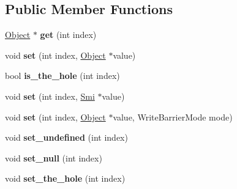 \subsection*{Public Member Functions}
\begin{DoxyCompactItemize}
\item 
\hypertarget{classv8_1_1internal_1_1_fixed_array_a44361ce215ec75f98ba22f84f7d4b360}{}\hyperlink{classv8_1_1internal_1_1_object}{Object} $\ast$ {\bfseries get} (int index)\label{classv8_1_1internal_1_1_fixed_array_a44361ce215ec75f98ba22f84f7d4b360}

\item 
\hypertarget{classv8_1_1internal_1_1_fixed_array_aafab6314d4f31024b9251909d1d88291}{}void {\bfseries set} (int index, \hyperlink{classv8_1_1internal_1_1_object}{Object} $\ast$value)\label{classv8_1_1internal_1_1_fixed_array_aafab6314d4f31024b9251909d1d88291}

\item 
\hypertarget{classv8_1_1internal_1_1_fixed_array_a7fe86da7c98e5930aa00d0df1b71feff}{}bool {\bfseries is\+\_\+the\+\_\+hole} (int index)\label{classv8_1_1internal_1_1_fixed_array_a7fe86da7c98e5930aa00d0df1b71feff}

\item 
\hypertarget{classv8_1_1internal_1_1_fixed_array_a0138e25841551aff834de2d631a91bfc}{}void {\bfseries set} (int index, \hyperlink{classv8_1_1internal_1_1_smi}{Smi} $\ast$value)\label{classv8_1_1internal_1_1_fixed_array_a0138e25841551aff834de2d631a91bfc}

\item 
\hypertarget{classv8_1_1internal_1_1_fixed_array_a4fbeb8596dd1226bd16018707e3989b4}{}void {\bfseries set} (int index, \hyperlink{classv8_1_1internal_1_1_object}{Object} $\ast$value, Write\+Barrier\+Mode mode)\label{classv8_1_1internal_1_1_fixed_array_a4fbeb8596dd1226bd16018707e3989b4}

\item 
\hypertarget{classv8_1_1internal_1_1_fixed_array_ace6f77f62936b9d34d3e6ea66d2a0c28}{}void {\bfseries set\+\_\+undefined} (int index)\label{classv8_1_1internal_1_1_fixed_array_ace6f77f62936b9d34d3e6ea66d2a0c28}

\item 
\hypertarget{classv8_1_1internal_1_1_fixed_array_a22a91c71f2f6ccbe56a7bf2aad86c64d}{}void {\bfseries set\+\_\+null} (int index)\label{classv8_1_1internal_1_1_fixed_array_a22a91c71f2f6ccbe56a7bf2aad86c64d}

\item 
\hypertarget{classv8_1_1internal_1_1_fixed_array_af5387df4a82963ca41ebc6bb6890368a}{}void {\bfseries set\+\_\+the\+\_\+hole} (int index)\label{classv8_1_1internal_1_1_fixed_array_af5387df4a82963ca41ebc6bb6890368a}


\end{DoxyCompactItemize}
